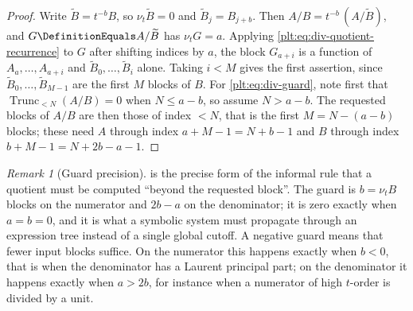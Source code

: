 \documentclass[11pt,oneside]{article}
\theoremstyle{plain}
\theoremstyle{definition}
\theoremstyle{remark}
\newtheorem{remark}[theorem]{Remark}
\newcommand{\ordt}{\nu_{t}}                              %
\newcommand{\Trunc}[2]{\operatorname{Trunc}_{<#2}#1}     %
\begin{document}
\begin{proof}
Write \(\widetilde B=t^{-b}B\), so \(\ordt\widetilde B=0\) and
\(\widetilde B_{j}=B_{j+b}\).  Then \(A/B=t^{-b}\,(A/\widetilde B)\), and
\(G\DefinitionEquals A/\widetilde B\) has \(\ordt G=a\).  Applying
\cref{plt:eq:div-quotient-recurrence} to \(G\) after shifting indices by \(a\),
the block \(G_{a+i}\) is a function of \(A_{a},\dots,A_{a+i}\) and
\(\widetilde B_{0},\dots,\widetilde B_{i}\) alone.  Taking \(i<M\) gives the
first assertion, since \(\widetilde B_{0},\dots,\widetilde B_{M-1}\) are the
first \(M\) blocks of \(B\).  For \cref{plt:eq:div-guard}, note first that
\(\Trunc{(A/B)}{N}=0\) when \(N\le a-b\), so assume \(N>a-b\).  The requested
blocks of \(A/B\) are then those of index \(<N\), that is the first
\(M=N-(a-b)\) blocks; these need \(A\) through index \(a+M-1=N+b-1\) and \(B\)
through index \(b+M-1=N+2b-a-1\).
\end{proof}

\begin{remark}[Guard precision]\label{plt:rmk:div-guard}
 is the precise form of the informal rule
that a quotient must be computed ``beyond the requested block''.  The guard is
\(b=\ordt B\) blocks on the numerator and \(2b-a\) on the denominator; it is
zero exactly when \(a=b=0\), and it is what a symbolic system must propagate
through an expression tree instead of a single global cutoff.
A negative guard means that fewer input blocks suffice.  On the numerator this
happens exactly when \(b<0\), that is when the denominator has a Laurent
principal part; on the denominator it happens exactly when \(a>2b\), for
instance when a numerator of high \(t\)-order is divided by a unit.
\end{remark}
\end{document}
